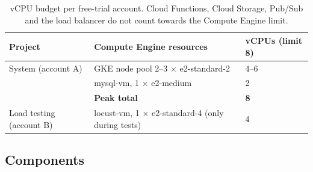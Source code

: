 \documentclass[11pt,a4paper]{article}
\begin{document}
\begin{table}[H]
\centering
\small
\begin{tabularx}{\linewidth}{L{3.6cm}Y L{2.6cm}}
\toprule
\textbf{Project} & \textbf{Compute Engine resources} & \textbf{vCPUs (limit 8)} \\
\midrule
System (account A) & GKE node pool 2--3 $\times$ e2-standard-2 & 4--6 \\
                   & mysql-vm, 1 $\times$ e2-medium & 2 \\
                   & \textbf{Peak total} & \textbf{8} \\
\midrule
Load testing (account B) & locust-vm, 1 $\times$ e2-standard-4 (only during tests) & 4 \\
\bottomrule
\end{tabularx}
\caption{vCPU budget per free-trial account. Cloud Functions, Cloud Storage,
Pub/Sub and the load balancer do not count towards the Compute Engine limit.}
\label{tab:vcpu}
\end{table}

\subsection{Components}
\end{document}

